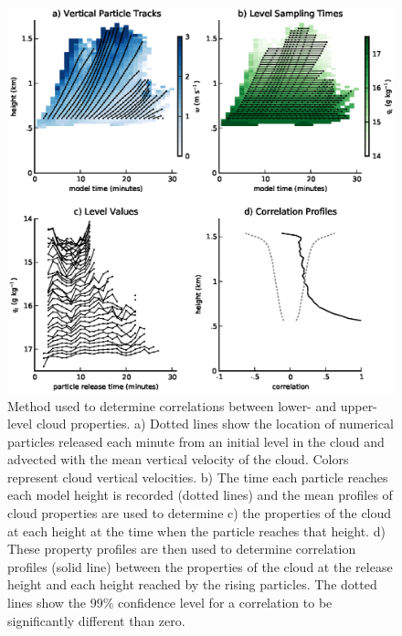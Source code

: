 \documentclass[acp]{copernicus}
\begin{document}
\begin{figure}[t]
\vspace*{2mm}
\begin{center}
\includegraphics[width=\textwidth]{./figures/cloud_base_schematic}
\end{center}
\caption{Method used to determine correlations between lower- and upper-level 
cloud properties. a) Dotted lines show the location of numerical particles 
released each minute from an initial level in the cloud and advected with the 
mean vertical velocity of the cloud.  Colors represent cloud vertical 
velocities.  b) The time each particle reaches each model height is recorded 
(dotted lines) and the mean profiles of cloud properties are used to determine 
c) the properties of the cloud at each height at the time when the particle 
reaches that height.  d) These property profiles are then used to determine 
correlation profiles (solid line) between the properties of the cloud at the 
release height and each height reached by the rising particles.  The dotted 
lines show the 99\% confidence level for a correlation to be significantly 
different than zero.}
\label{fig:cloud_base_schematic}
\end{figure}
\end{document}

